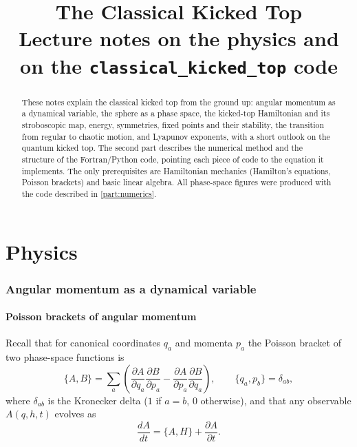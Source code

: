 \documentclass[11pt,a4paper]{article}
\title{The Classical Kicked Top\\[0.3em] \large Lecture notes on the physics and on the \texttt{classical\_kicked\_top} code}
\author{}
\date{}
\newcommand{\PB}[2]{\{#1,#2\}}
\begin{document}
\maketitle

\begin{abstract}
These notes explain the classical kicked top from the ground up: angular momentum as a dynamical variable, the
sphere as a phase space, the kicked-top Hamiltonian and its stroboscopic map, energy, symmetries, fixed points and
their stability, the transition from regular to chaotic motion, and Lyapunov exponents, with a short outlook on the
quantum kicked top. The second part describes the numerical method and the structure of the Fortran/Python code,
pointing each piece of code to the equation it implements. The only prerequisites are Hamiltonian mechanics
(Hamilton's equations, Poisson brackets) and basic linear algebra. All phase-space figures were produced with the code
described in \cref{part:numerics}.
\end{abstract}

\tableofcontents
\newpage

\part{Physics}

\section{Angular momentum as a dynamical variable}\label{sec:angmom}

\subsection{Poisson brackets of angular momentum}

Recall that for canonical coordinates $q_a$ and momenta $p_a$ the Poisson bracket of two phase-space functions is
\begin{equation}
  \PB{A}{B} = \sum_a \left( \frac{\partial A}{\partial q_a}\frac{\partial B}{\partial p_a}
                          - \frac{\partial A}{\partial p_a}\frac{\partial B}{\partial q_a} \right),
  \qquad \PB{q_a}{p_b} = \delta_{ab},
\end{equation}
where $\delta_{ab}$ is the Kronecker delta ($1$ if $a=b$, $0$ otherwise), and that any observable $A(q,h,t)$
evolves as
\begin{equation}\label{eq:eom-general}
  \frac{dA}{dt} = \PB{A}{H} + \frac{\partial A}{\partial t}.
\end{equation}
\end{document}
